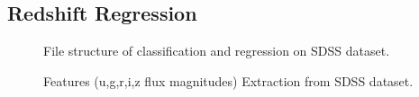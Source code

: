\subsection{Redshift Regression}
\begin{figure}[H]
	\centering
	\caption{File structure of classification and regression on SDSS dataset.}
	\label{fig:dvs_2}
\end{figure}
\begin{figure}[H]
	\centering
	\caption{Features (u,g,r,i,z flux magnitudes) Extraction from SDSS dataset.}
	\label{fig:r1}
\end{figure}
